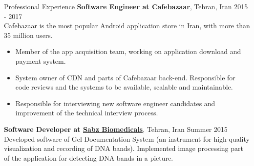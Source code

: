 \documentclass{resume} %
\begin{document}
\begin{rSection}{Professional Experience}
	{\bf Software Engineer at \href{https://cafebazaar.ir/}{Cafebazaar}}, Tehran, Iran \hfill 2015 - 2017
	\\ Cafebazaar is the most popular Android application store in Iran, with more than 35 million users.
	\begin{itemize}
		\item Member of the app acquisition team, working on application download and payment system.
		\item System owner of CDN and parts of Cafebazaar back-end. Responsible for code reviews and the systems to be available, scalable and maintainable.
		\item Responsible for interviewing new software engineer candidates and improvement of the technical interview process.
	\end{itemize}
	
	{\bf Software Developer at \href{http://www.sabzgroup.com/}{Sabz Biomedicals}}, Tehran, Iran \hfill Summer 2015
	\\Developed software of Gel Documentation System (an instrument for high-quality visualization and recording of DNA bands). Implemented image processing part of the application for detecting DNA bands in a picture.
\end{rSection}



\end{document}

